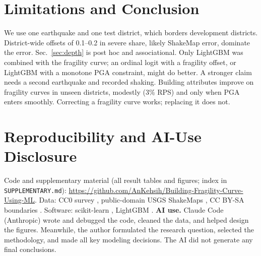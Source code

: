 \documentclass{article}
\begin{document}
\section{Limitations and Conclusion}
We use one earthquake and one test district, which borders development districts. District-wide offsets of
0.1--0.2 in severe share, likely ShakeMap error, dominate the error. Sec.~\ref{sec:depth} is post hoc and associational. Only LightGBM was combined
with the fragility curve; an ordinal logit with a fragility offset, or LightGBM with a monotone PGA constraint,
might do better. A stronger claim needs a second earthquake and recorded shaking. Building attributes improve on
fragility curves in unseen districts, modestly (3\% RPS) and only when PGA enters smoothly. Correcting a
fragility curve works; replacing it does not.

\section{Reproducibility and AI-Use Disclosure}
Code and supplementary material (all result tables and figures; index in \texttt{SUPPLEMENTARY.md}):
\url{https://github.com/AnKehsih/Building-Fragility-Curve-Using-ML}. Data: CC0 survey \citep{nepaldata}, public-domain
USGS ShakeMaps \citep{shakemap}, CC BY-SA boundaries \citep{boundaries}. Software:
scikit-learn \citep{pedregosa2011}, LightGBM \citep{ke2017}. \textbf{AI use.} Claude Code (Anthropic) wrote and debugged the code, cleaned the data, and helped design the figures. Meanwhile, the author formulated the research question, selected the methodology, and made all key modeling decisions. The AI did not generate any final conclusions.
\end{document}
